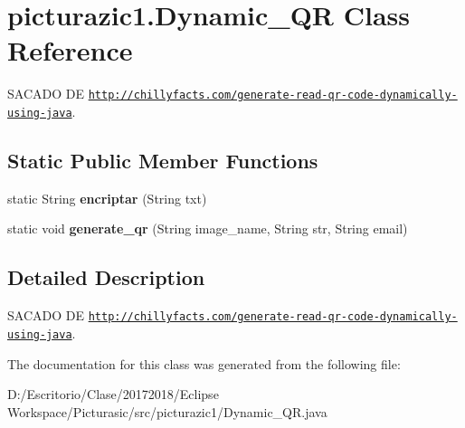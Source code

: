 \hypertarget{classpicturazic1_1_1_dynamic___q_r}{}\section{picturazic1.\+Dynamic\+\_\+\+QR Class Reference}
\label{classpicturazic1_1_1_dynamic___q_r}


S\+A\+C\+A\+DO DE \href{http://chillyfacts.com/generate-read-qr-code-dynamically-using-java}{\tt http\+://chillyfacts.\+com/generate-\/read-\/qr-\/code-\/dynamically-\/using-\/java}.  


\subsection*{Static Public Member Functions}
\begin{DoxyCompactItemize}
\item 
\mbox{\label{classpicturazic1_1_1_dynamic___q_r_aac67582f2765a22cd14e8d7470ca699f}} 
static String {\bfseries encriptar} (String txt)
\item 
\mbox{\label{classpicturazic1_1_1_dynamic___q_r_af19cbcbd1b21b2a863289c51a600546a}} 
static void {\bfseries generate\+\_\+qr} (String image\+\_\+name, String str, String email)
\end{DoxyCompactItemize}


\subsection{Detailed Description}
S\+A\+C\+A\+DO DE \href{http://chillyfacts.com/generate-read-qr-code-dynamically-using-java}{\tt http\+://chillyfacts.\+com/generate-\/read-\/qr-\/code-\/dynamically-\/using-\/java}. 

The documentation for this class was generated from the following file\+:\begin{DoxyCompactItemize}
\item 
D\+:/\+Escritorio/\+Clase/20172018/\+Eclipse Workspace/\+Picturasic/src/picturazic1/Dynamic\+\_\+\+Q\+R.\+java\end{DoxyCompactItemize}
